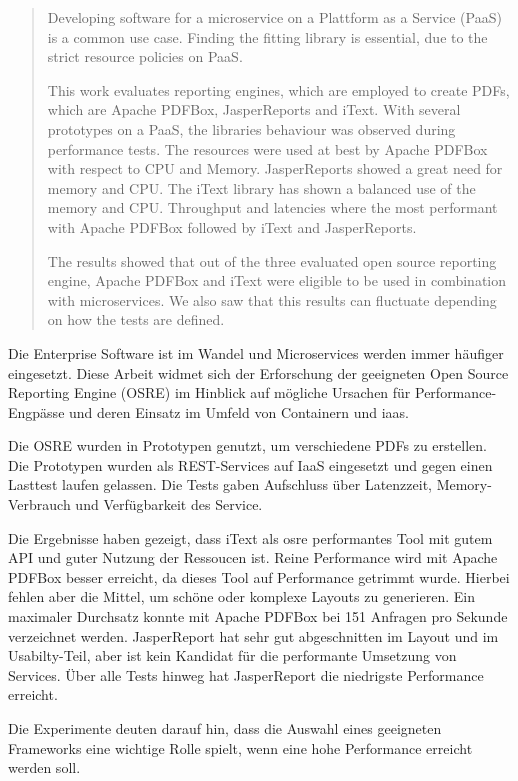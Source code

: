 \documentclass[main.tex]{subfiles}
\begin{document}

\begin{abstract}
\selectlanguage{\english}
Developing software for a microservice on a Plattform as a Service (PaaS) is a common use case. 
Finding the fitting library is essential, due to the strict resource policies on PaaS.

This work evaluates reporting engines, which are employed to create PDFs, which are  Apache PDFBox, JasperReports and iText. With several prototypes on a PaaS, the libraries behaviour was observed during performance tests.
The resources were used at best by Apache PDFBox with respect to CPU and Memory. JasperReports showed a great need for memory and CPU. The iText library has shown a balanced use of the memory and CPU. Throughput and latencies where the most performant with Apache PDFBox followed by iText and JasperReports. 

The results showed that out of the three evaluated open source reporting engine, Apache PDFBox and iText were eligible to be used in combination with microservices. We also saw that this results can fluctuate depending on how the tests are defined.
\end{abstract}

\begin{zusammenfassung}

Die Enterprise Software ist im Wandel und Microservices werden immer häufiger eingesetzt. 
\noindent
Diese Arbeit widmet sich der Erforschung der geeigneten Open Source Reporting Engine (OSRE) im Hinblick auf mögliche Ursachen für Performance-Engpässe und deren Einsatz im Umfeld von Containern und \acrfull{iaas}. 

\noindent
Die OSRE wurden in Prototypen genutzt, um verschiedene PDFs zu  erstellen. Die Prototypen wurden als REST-Services auf IaaS eingesetzt und gegen einen Lasttest laufen gelassen. Die Tests gaben Aufschluss über Latenzzeit, Memory-Verbrauch und  Verfügbarkeit des Service. 

\noindent
Die Ergebnisse haben gezeigt, dass iText als \acrlong{osre} performantes Tool mit gutem API und guter Nutzung der Ressoucen ist. Reine Performance wird mit Apache PDFBox besser erreicht, da dieses Tool auf Performance getrimmt wurde. Hierbei fehlen aber die Mittel, um schöne oder komplexe Layouts zu generieren. Ein maximaler Durchsatz konnte mit Apache PDFBox bei 151 Anfragen pro Sekunde verzeichnet werden. JasperReport hat sehr gut abgeschnitten im Layout und im Usabilty-Teil, aber ist kein Kandidat für die performante Umsetzung von Services. Über alle Tests hinweg hat JasperReport die niedrigste Performance erreicht.

\noindent
Die Experimente deuten darauf hin, dass die Auswahl eines geeigneten Frameworks eine wichtige Rolle spielt, wenn eine hohe Performance erreicht werden soll.




\end{zusammenfassung}
\end{document}
